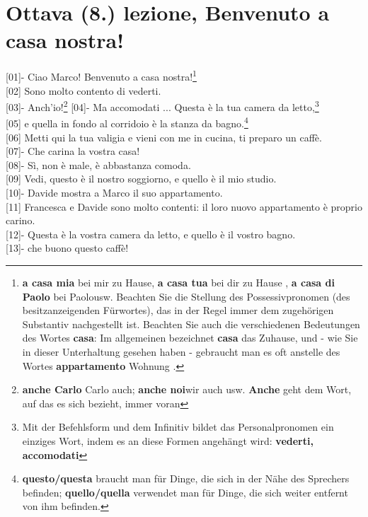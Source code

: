 \documentclass{article}
\begin{document}
\section{Ottava (8.) lezione, Benvenuto a casa nostra!}
{[01]}- Ciao Marco! Benvenuto a casa nostra!\footnote{\textbf{a casa mia}
\glqq bei mir zu Hause\grqq, \textbf{a casa tua} \glqq bei dir zu Hause\grqq
, \textbf{a casa di Paolo} \glqq bei Paolo\grqq usw. Beachten Sie die Stellung
des Possessivpronomen (des besitzanzeigenden Fürwortes), das in der Regel
immer dem zugehörigen Substantiv nachgestellt ist. Beachten Sie auch die
verschiedenen Bedeutungen des Wortes \textbf{casa}: Im allgemeinen bezeichnet
\textbf{casa} das Zuhause, und - wie Sie in dieser Unterhaltung gesehen haben -
gebraucht man es oft anstelle des Wortes \textbf{appartamento} \glqq Wohnung
\grqq.}\\
{[02]} Sono molto contento di vederti.\\
{[03]}- Anch'io!\footnote{\textbf{anche Carlo} \glqq Carlo auch\grqq;
\textbf{anche noi}\glqq wir auch \grqq usw. \textbf{Anche} geht dem Wort, auf
das es sich bezieht, immer voran}
{[04]}- Ma accomodati ... Questa è la tua camera da letto,\footnote{Mit der
Befehlsform und dem Infinitiv bildet das Personalpronomen ein einziges Wort,
indem es an diese Formen angehängt wird: \textbf{vederti, accomodati}}\\
{[05]} e quella in fondo al corridoio è la stanza da bagno.\footnote{\textbf{
questo/questa} braucht man für Dinge, die sich in der Nähe des Sprechers
befinden; \textbf{quello/quella} verwendet man für Dinge, die sich weiter
entfernt von ihm befinden.}\\
{[06]} Metti qui la tua valigia e vieni con me in cucina, ti preparo un caffè.\\
{[07]}- Che carina la vostra casa!\\
{[08]}- Sì, non è male, è abbastanza comoda.\\
{[09]} Vedi, questo è il nostro soggiorno, e quello è il mio studio.\\
{[10]}- Davide mostra a Marco il suo appartamento.\\
{[11]} Francesca e Davide sono molto contenti: il loro nuovo appartamento
è proprio carino.\\
{[12]}- Questa è la vostra camera da letto, e quello è il vostro bagno.\\
{[13]}- che buono questo caffè!\\
\end{document}
